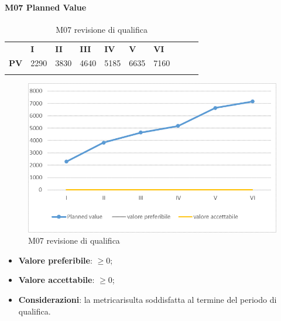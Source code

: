 \paragraph{M07 Planned Value} \mbox{}
\begin{longtable}[H!] {						
		>{}p{50mm}  		
		>{}p{8mm}
		>{}p{8mm}		
		>{}p{8mm}		
		>{}p{8mm}		
		>{}p{8mm}		
		>{}p{8mm}
		>{}p{8mm}
		>{}p{8mm}
		>{}p{8mm}
	}
	\rowcolor{gray!50}
	\textbf{} & \textbf{I} & \textbf{II} & \textbf{III} & \textbf{IV} & \textbf{V} & \textbf{VI} \TBstrut \\ [2mm]
	\textbf{PV} & 2290 & 3830 & 4640 & 5185 & 6635 & 7160 \TBstrut \\ [2mm]
	\rowcolor{white}
	\caption{M07 revisione di qualifica}
\end{longtable}
\begin{figure}[H] 	
	\includegraphics[width=\linewidth]{./img/grafici/RQ7.png}	
	\caption{M07 revisione di qualifica}	
\end{figure}
\begin{itemize}
	\item \textbf{Valore preferibile}: $\ge0$;
	\item \textbf{Valore accettabile}: $\ge0$;
	\item \textbf{Considerazioni}: la metrica\glosp risulta soddisfatta al termine del periodo di qualifica.
\end{itemize}

